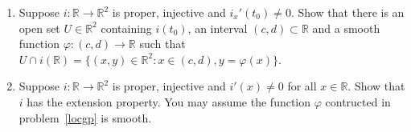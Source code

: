 \documentclass[12pt]{article}
\newcommand{\R}{\mathbb{R}}
\begin{document}
\begin{enumerate}
\item Suppose $i:\R\to\R^2$ is proper, injective and $i_x'(t_0)\neq 0$. Show that there is an open set $U\in\R^2$ containing $i(t_0)$, an interval $(c,d)\subset \R$  and a smooth function $\varphi:(c,d)\to\R$  such that $U\cap i(\R)=\{(x,y)\in\R^2: x\in (c,d), y=\varphi(x)\}$.

\item Suppose $i:\R\to\R^2$ is proper, injective and $i'(x)\neq 0$ for all $x\in\R$. Show that $i$ has the extension property. You may assume the function $\varphi$ contructed in problem~\ref{locgp} is smooth.

\end{enumerate}
\end{document}
